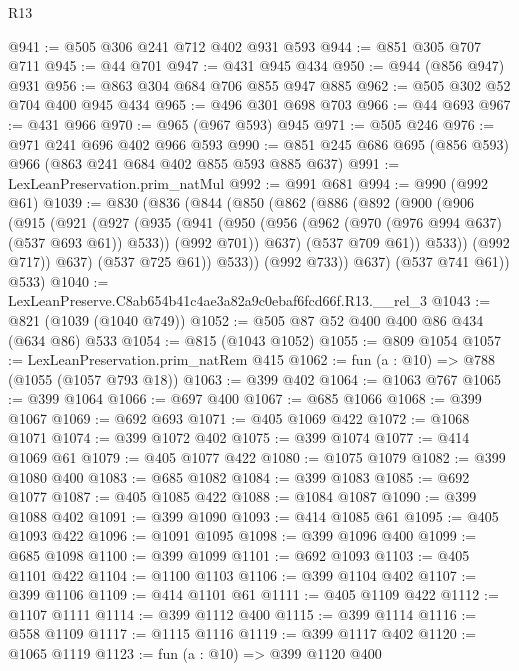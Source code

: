 \begin{lexlean}{R13}
\begin{coremodule}
@941 := @505 @306 @241 @712 @402 @931 @593
@944 := @851 @305 @707 @711
@945 := @44 @701
@947 := @431 @945 @434
@950 := @944 (@856 @947) @931
@956 := @863 @304 @684 @706 @855 @947 @885
@962 := @505 @302 @52 @704 @400 @945 @434
@965 := @496 @301 @698 @703
@966 := @44 @693
@967 := @431 @966
@970 := @965 (@967 @593) @945
@971 := @505 @246
@976 := @971 @241 @696 @402 @966 @593
@990 := @851 @245 @686 @695 (@856 @593) @966 (@863 @241 @684 @402 @855 @593 @885 @637)
@991 := LexLeanPreservation.prim_natMul
@992 := @991 @681
@994 := @990 (@992 @61)
@1039 := @830
    (@836
      (@844
        (@850
          (@862
            (@886
              (@892
                (@900
                  (@906
                    (@915
                      (@921
                        (@927
                          (@935
                            (@941
                              (@950
                                (@956 (@962 (@970 (@976 @994 @637) (@537 @693 @61)) @533))
                                (@992 @701))
                              @637)
                            (@537 @709 @61))
                          @533))
                      (@992 @717))
                    @637)
                  (@537 @725 @61))
                @533))
            (@992 @733))
          @637)
        (@537 @741 @61))
      @533)
@1040 := LexLeanPreserve.C8ab654b41c4ae3a82a9c0ebaf6fcd66f.R13.__rel_3
@1043 := @821 (@1039 (@1040 @749))
@1052 := @505 @87 @52 @400 @400 @86 @434 (@634 @86) @533
@1054 := @815 (@1043 @1052)
@1055 := @809 @1054
@1057 := LexLeanPreservation.prim_natRem @415
@1062 := fun (a : @10) => @788 (@1055 (@1057 @793 @18))
@1063 := @399 @402
@1064 := @1063 @767
@1065 := @399 @1064
@1066 := @697 @400
@1067 := @685 @1066
@1068 := @399 @1067
@1069 := @692 @693
@1071 := @405 @1069 @422
@1072 := @1068 @1071
@1074 := @399 @1072 @402
@1075 := @399 @1074
@1077 := @414 @1069 @61
@1079 := @405 @1077 @422
@1080 := @1075 @1079
@1082 := @399 @1080 @400
@1083 := @685 @1082
@1084 := @399 @1083
@1085 := @692 @1077
@1087 := @405 @1085 @422
@1088 := @1084 @1087
@1090 := @399 @1088 @402
@1091 := @399 @1090
@1093 := @414 @1085 @61
@1095 := @405 @1093 @422
@1096 := @1091 @1095
@1098 := @399 @1096 @400
@1099 := @685 @1098
@1100 := @399 @1099
@1101 := @692 @1093
@1103 := @405 @1101 @422
@1104 := @1100 @1103
@1106 := @399 @1104 @402
@1107 := @399 @1106
@1109 := @414 @1101 @61
@1111 := @405 @1109 @422
@1112 := @1107 @1111
@1114 := @399 @1112 @400
@1115 := @399 @1114
@1116 := @558 @1109
@1117 := @1115 @1116
@1119 := @399 @1117 @402
@1120 := @1065 @1119
@1123 := fun (a : @10) => @399 @1120 @400

\end{coremodule}
\end{lexlean}
